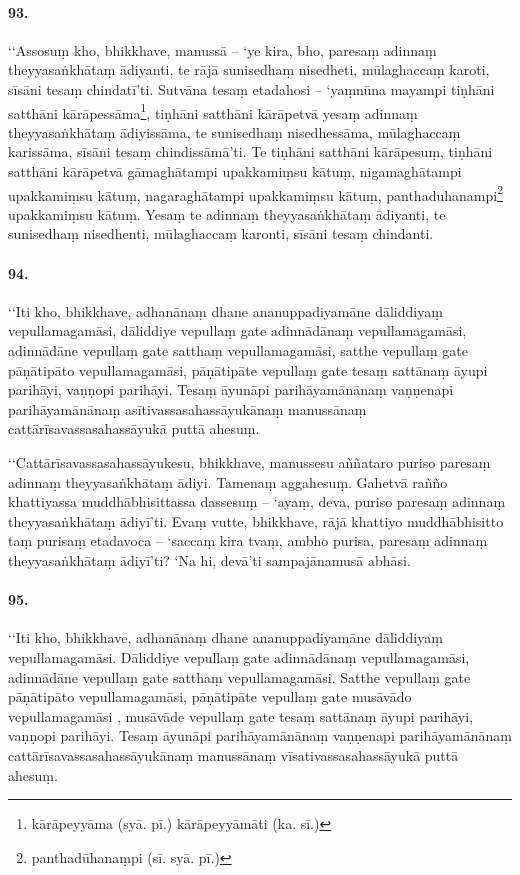 \paragraph{93.} ‘‘Assosuṃ kho, bhikkhave, manussā – ‘ye kira, bho, paresaṃ adinnaṃ theyyasaṅkhātaṃ ādiyanti, te rājā sunisedhaṃ nisedheti, mūlaghaccaṃ karoti, sīsāni tesaṃ chindatī’ti. Sutvāna tesaṃ etadahosi – ‘yaṃnūna mayampi tiṇhāni satthāni kārāpessāma\footnote{kārāpeyyāma (syā. pī.) kārāpeyyāmāti (ka. sī.)}, tiṇhāni satthāni kārāpetvā yesaṃ adinnaṃ theyyasaṅkhātaṃ ādiyissāma, te sunisedhaṃ nisedhessāma, mūlaghaccaṃ karissāma, sīsāni tesaṃ chindissāmā’ti. Te tiṇhāni satthāni kārāpesuṃ, tiṇhāni satthāni kārāpetvā gāmaghātampi upakkamiṃsu kātuṃ, nigamaghātampi upakkamiṃsu kātuṃ, nagaraghātampi upakkamiṃsu kātuṃ, panthaduhanampi\footnote{panthadūhanaṃpi (sī. syā. pī.)} upakkamiṃsu kātuṃ. Yesaṃ te adinnaṃ theyyasaṅkhātaṃ ādiyanti, te sunisedhaṃ nisedhenti, mūlaghaccaṃ karonti, sīsāni tesaṃ chindanti.

\paragraph{94.} ‘‘Iti kho, bhikkhave, adhanānaṃ dhane ananuppadiyamāne dāliddiyaṃ vepullamagamāsi, dāliddiye vepullaṃ gate adinnādānaṃ vepullamagamāsi, adinnādāne vepullaṃ gate satthaṃ vepullamagamāsi, satthe vepullaṃ gate pāṇātipāto vepullamagamāsi, pāṇātipāte vepullaṃ gate tesaṃ sattānaṃ āyupi parihāyi, vaṇṇopi parihāyi. Tesaṃ āyunāpi parihāyamānānaṃ vaṇṇenapi parihāyamānānaṃ asītivassasahassāyukānaṃ manussānaṃ cattārīsavassasahassāyukā puttā ahesuṃ.

‘‘Cattārīsavassasahassāyukesu, bhikkhave, manussesu aññataro puriso paresaṃ adinnaṃ theyyasaṅkhātaṃ ādiyi. Tamenaṃ aggahesuṃ. Gahetvā rañño khattiyassa muddhābhisittassa dassesuṃ – ‘ayaṃ, deva, puriso paresaṃ adinnaṃ theyyasaṅkhātaṃ ādiyī’ti. Evaṃ vutte, bhikkhave, rājā khattiyo muddhābhisitto taṃ purisaṃ etadavoca – ‘saccaṃ kira tvaṃ, ambho purisa, paresaṃ adinnaṃ theyyasaṅkhātaṃ ādiyī’ti? ‘Na hi, devā’ti sampajānamusā abhāsi.

\paragraph{95.} ‘‘Iti kho, bhikkhave, adhanānaṃ dhane ananuppadiyamāne dāliddiyaṃ vepullamagamāsi. Dāliddiye vepullaṃ gate adinnādānaṃ vepullamagamāsi, adinnādāne vepullaṃ gate satthaṃ vepullamagamāsi. Satthe vepullaṃ gate pāṇātipāto vepullamagamāsi, pāṇātipāte vepullaṃ gate musāvādo vepullamagamāsi , musāvāde vepullaṃ gate tesaṃ sattānaṃ āyupi parihāyi, vaṇṇopi parihāyi. Tesaṃ āyunāpi parihāyamānānaṃ vaṇṇenapi parihāyamānānaṃ cattārīsavassasahassāyukānaṃ manussānaṃ vīsativassasahassāyukā puttā ahesuṃ.

